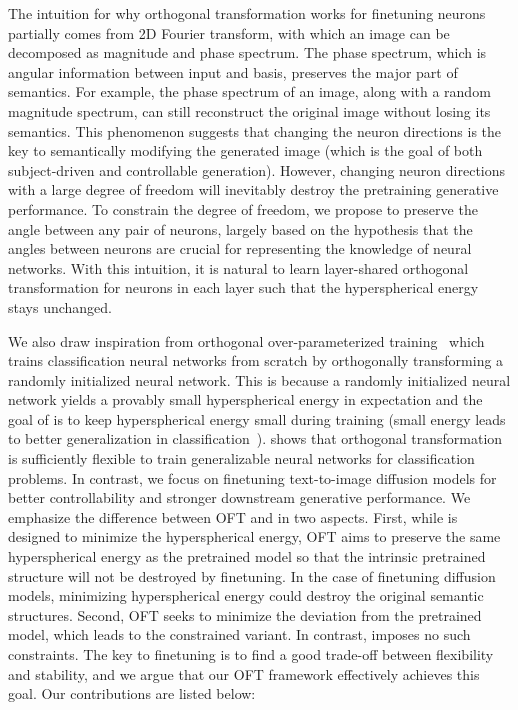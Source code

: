 \documentclass{article}
\begin{document}
The intuition for why orthogonal transformation works for finetuning neurons partially comes from 2D Fourier transform, with which an image can be decomposed as magnitude and phase spectrum. The phase spectrum, which is angular information between input and basis, preserves the major part of semantics. For example, the phase spectrum of an image, along with a random magnitude spectrum, can still reconstruct the original image without losing its semantics. This phenomenon suggests that changing the neuron directions is the key to semantically modifying the generated image (which is the goal of both subject-driven and controllable generation). However, changing neuron directions with a large degree of freedom will inevitably destroy the pretraining generative performance. To constrain the degree of freedom, we propose to preserve the angle between any pair of neurons, largely based on the hypothesis that the angles between neurons are crucial for representing the knowledge of neural networks. With this intuition, it is natural to learn layer-shared orthogonal transformation for neurons in each layer such that the hyperspherical energy stays unchanged.

We also draw inspiration from orthogonal over-parameterized training~\cite{liu2021orthogonal} which trains classification neural networks from scratch by orthogonally transforming a randomly initialized neural network. This is because a randomly initialized neural network yields a provably small hyperspherical energy in expectation and the goal of \cite{liu2021orthogonal} is to keep hyperspherical energy small during training (small energy leads to better generalization in classification~\cite{liu2018learning,lin2020regularizing}). \cite{liu2021orthogonal} shows that orthogonal transformation is sufficiently flexible to train generalizable neural networks for classification problems. In contrast, we focus on finetuning text-to-image diffusion models for better controllability and stronger downstream generative performance. %
We emphasize the difference between OFT and \cite{liu2021orthogonal} in two aspects. First, while \cite{liu2021orthogonal} is designed to minimize the hyperspherical energy, OFT aims to preserve the same hyperspherical energy as the pretrained model so that the intrinsic pretrained structure will not be destroyed by finetuning. In the case of finetuning diffusion models, minimizing hyperspherical energy could destroy the original semantic structures. Second, OFT seeks to minimize the deviation from the pretrained model, which leads to the constrained variant. In contrast, \cite{liu2021orthogonal} imposes no such constraints. The key to finetuning is to find a good trade-off between flexibility and stability, and we argue that our OFT framework effectively achieves this goal. Our contributions are listed below:
\end{document}
